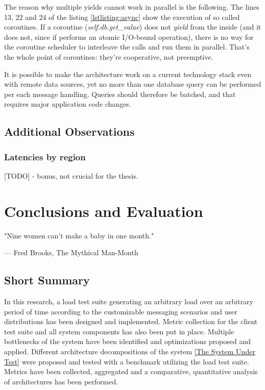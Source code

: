\documentclass{uvamscse}
\begin{document}
The reason why multiple yields cannot work in parallel is the following. The lines 13, 22 and 24 of the listing \ref{lstlisting:async} show the execution of so called coroutines. If a coroutine (\textit{self.db.get\_value}) does not \textit{yield} from the inside (and it does not, since if performs an atomic I/O-bound operation), there is no way for the coroutine scheduler to interleave the calls and run them in parallel. That's the whole point of coroutines: they're cooperative, not preemptive.

It is possible to make the architecture work on a current technology stack even with remote data sources, yet no more than one database query can be performed per each message handling. Queries should therefore be batched, and that requires major application code changes.

\section{Additional Observations}

\subsection{Latencies by region}
[TODO] - bonus, not crucial for the thesis. 



\chapter{Conclusions and Evaluation}\label{Conclusions and Evaluation}
\epigraph{"Nine women can't make a baby in one month."}{--- Fred Brooks, The Mythical Man-Month}

\section{Short Summary}
In this research, a load test suite generating an arbitrary load over an arbitrary period of time according to the customizable messaging scenarios and user distributions has been designed and implemented. Metric collection for the client test suite and all system components has also been put in place. Multiple bottlenecks of the system have been identified and optimizations proposed and applied. Different architecture decompositions of the system \ref{The System Under Test} were proposed and tested with a benchmark utilizing the load test suite. Metrics have been collected, aggregated and a comparative, quantitative analysis of architectures has been performed.
\end{document}
